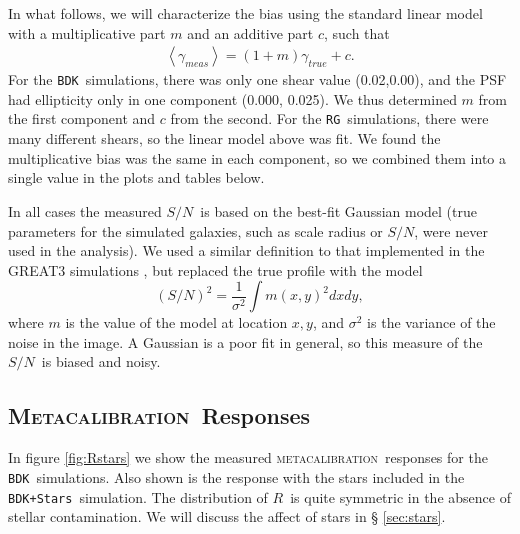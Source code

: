 \documentclass[iop]{emulateapj}
\newcommand{\snr}{$S/N$}
\newcommand{\mcal}{\textsc{metacalibration}}
\newcommand{\Mcal}{\textsc{Metacalibration}}
\newcommand{\mcalR}{\mbox{\boldmath $R$}}
\newcommand{\nsimShear}{0.02,0.00}
\newcommand{\bdksim}{\texttt{BDK}}
\newcommand{\bdstar}{\texttt{BDK+Stars}}
\newcommand{\rgsim}{\texttt{RG}}
\begin{document}
In what follows, we will characterize the bias using the standard linear model
\citep[e.g.][]{great3} with a multiplicative part $m$ and an additive part $c$,
such that
\begin{align}
	\left< \gamma_{meas} \right> = (1+m) \gamma_{true} + c.
\end{align}
For the \bdksim\ simulations, there was only one shear value (\nsimShear),
and the PSF had ellipticity only in one component (0.000, 0.025). We
thus determined $m$ from the first component and $c$ from the
second.  For the \rgsim\ simulations, there were many different shears,
so the linear model above was fit.  We found the multiplicative
bias was the same in each component, so we combined them into
a single value in the plots and tables below.

In all cases the measured \snr\ is based on the best-fit Gaussian model (true
parameters for the simulated galaxies, such as scale radius or \snr, were never
used in the analysis).  We used a similar definition to that implemented in the
GREAT3 simulations \citep[][equation 16]{great3}, but replaced the true profile
with the model
\begin{equation}
    (S/N)^2 = \frac{1}{\sigma^2} \int m(x,y)^2 dx dy,
\end{equation}
where $m$ is the value of the model at location $x,y$, and $\sigma^2$ is the
variance of the noise in the image. A Gaussian is a poor fit in general, so
this measure of the \snr\ is biased and noisy.

\subsection{\Mcal\ Responses}

In figure \ref{fig:Rstars} we show the measured \mcal\ responses for the
\bdksim\  simulations.  Also shown is the response with the stars included in
the \bdstar\ simulation.  The distribution of \mcalR\ is quite symmetric in the
absence of stellar contamination.  We will discuss the affect of stars in \S
\ref{sec:stars}.
\end{document}
